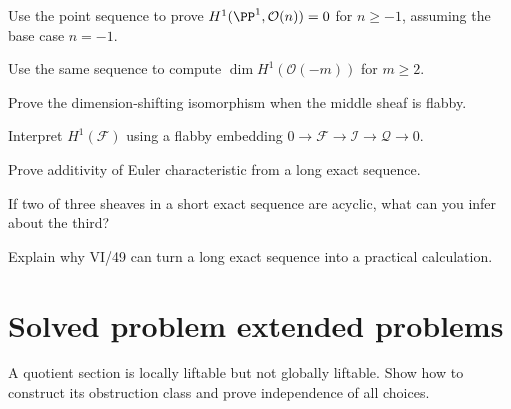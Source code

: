 \begin{exercise}\label{exr:vi48-18}
Use the point sequence to prove $H^1(\PP^1,\mathcal O(n))=0$ for $n\ge-1$, assuming the base case $n=-1$.
\end{exercise}

\begin{exercise}\label{exr:vi48-19}
Use the same sequence to compute $\dim H^1(\mathcal O(-m))$ for $m\ge2$.
\end{exercise}

\begin{exercise}\label{exr:vi48-20}
Prove the dimension-shifting isomorphism when the middle sheaf is flabby.
\end{exercise}

\begin{exercise}\label{exr:vi48-21}
Interpret $H^1(\mathcal F)$ using a flabby embedding $0\to\mathcal F\to\mathcal I\to\mathcal Q\to0$.
\end{exercise}

\begin{exercise}\label{exr:vi48-22}
Prove additivity of Euler characteristic from a long exact sequence.
\end{exercise}

\begin{exercise}\label{exr:vi48-23}
If two of three sheaves in a short exact sequence are acyclic, what can you infer about the third?
\end{exercise}

\begin{exercise}\label{exr:vi48-24}
Explain why VI/49 can turn a long exact sequence into a practical calculation.
\end{exercise}

\ifdefined\IncludeExerciseHints

\fi
\ifdefined\IncludeExerciseSolutions

\fi

\section{Solved problem extended problems}
\begin{problem}\label{prob:vi48-01}
A quotient section is locally liftable but not globally liftable.  Show how to construct its obstruction class and prove independence of all choices.
\end{problem}

